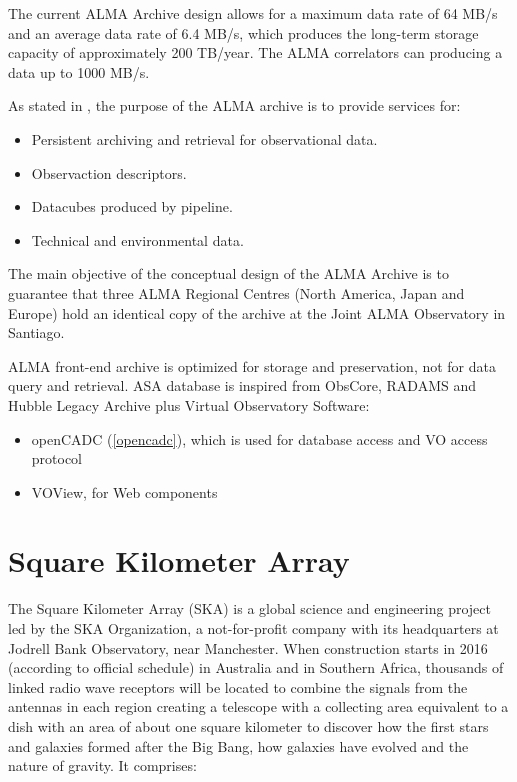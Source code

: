The current ALMA Archive design allows for a maximum data rate of 64 MB/s and an average data rate
of 6.4 MB/s, which produces the long-term storage capacity of approximately 200 TB/year. The
ALMA correlators can producing a data up to 1000 MB/s. \newline

 
As stated in \cite{Etoka12}, the purpose of the ALMA archive is to provide services for:

\begin{itemize}
\item Persistent archiving and retrieval for observational data.
\item Observaction descriptors.
\item Datacubes produced by pipeline.
\item Technical and environmental data.
\end{itemize}

The main objective of the conceptual design of the ALMA Archive is to guarantee that three ALMA Regional Centres (North America, Japan and Europe) hold an identical copy of the archive at the Joint ALMA Observatory in Santiago. \newline

ALMA front-end archive is optimized for storage and preservation, not for data query and retrieval. ASA database is inspired from ObsCore, RADAMS and Hubble Legacy Archive plus Virtual Observatory Software:

\begin{itemize}
\item openCADC (\ref{opencadc}), which is used for database access and VO access protocol
\item VOView, for Web components
\end{itemize}



\section{Square Kilometer Array}

The Square Kilometer Array (SKA) is a global science and engineering project led by the SKA Organization, a not-for-profit company with its headquarters at Jodrell Bank Observatory, near Manchester. When construction starts in 2016 (according to official schedule) in Australia and in Southern Africa, thousands of linked radio wave receptors will be located to combine the signals from the antennas in each region creating a telescope with a collecting area equivalent to a dish with an area of about one square kilometer to discover how the first stars and galaxies formed after the Big Bang, how galaxies have evolved and the nature of gravity. It comprises:


